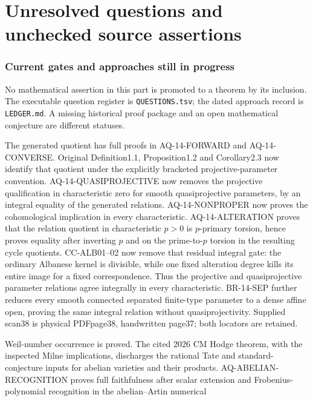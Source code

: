 \clearpage
\part{Unresolved questions and unchecked source assertions}
\section{Current gates and approaches still in progress}
No mathematical assertion in this part is promoted to a theorem by
its inclusion. The executable question register is \texttt{QUESTIONS.tsv};
the dated approach record is \texttt{LEDGER.md}. A missing historical
proof package and an open mathematical conjecture are different statuses.

\begin{description}[style=nextline,leftmargin=0pt]
\item[Cote 14, scans 25--38: original quotient identification.]
The generated quotient has full proofs in AQ-14-FORWARD and
AQ-14-CONVERSE. Original Definition1.1, Proposition1.2 and
Corollary2.3 now identify that quotient under the explicitly bracketed
projective-parameter convention. AQ-14-QUASIPROJECTIVE now removes the projective qualification
in characteristic zero for smooth quasiprojective parameters, by an
integral equality of the generated relations. AQ-14-NONPROPER now
proves the cohomological implication in every characteristic.
AQ-14-ALTERATION proves that the relation quotient in characteristic
$p>0$ is $p$-primary torsion, hence proves equality after inverting $p$
and on the prime-to-$p$ torsion in the resulting cycle quotients.
CC-ALB01--02 now remove that residual integral gate: the ordinary
Albanese kernel is divisible, while one fixed alteration degree kills
its entire image for a fixed correspondence. Thus the projective and
quasiprojective parameter relations agree integrally in every
characteristic. BR-14-SEP further reduces every smooth connected
separated finite-type parameter to a dense affine open, proving
the same integral relation without quasiprojectivity. Supplied scan38 is physical PDFpage38,
handwritten page37; both locators are retained.
\item[Cote 15, scans 100--106: full simple-motive classification.]
Weil-number occurrence is proved. The cited 2026 CM Hodge theorem,
with the inspected Milne implications, discharges the rational Tate and
standard-conjecture inputs for abelian varieties and their products.
AQ-ABELIAN-RECOGNITION proves full faithfulness after scalar extension
and Frobenius-polynomial recognition in the abelian--Artin numerical

\end{description}
